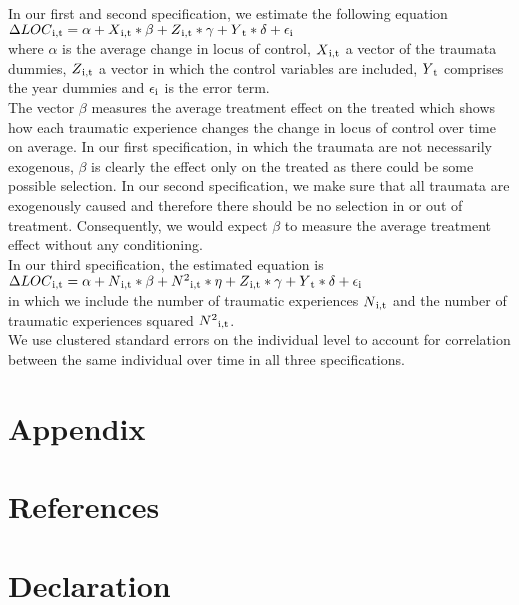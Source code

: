 \documentclass[12pt,a4paper,fleqn]{article}
\begin{document}
In our first and second specification, we estimate the following equation\\
$ \Delta LOC \textsubscript{i,t}= \alpha + X \textsubscript{i,t} * \beta + Z \textsubscript{i,t} * \gamma + Y\textsubscript{t} * \delta + \epsilon\textsubscript{i}  $ \\
where $\alpha$ is the average change in locus of control, $ X\textsubscript{i,t}$ a vector of the traumata dummies, $ Z\textsubscript{i,t}$ a vector in which the control variables are included, $ Y\textsubscript{t}$ comprises the year dummies and $\epsilon\textsubscript{i}$ is the error term. \\
The vector $\beta$ measures the average treatment effect on the treated which shows how each traumatic experience changes the change in locus of control over time on average. In our first specification, in which the traumata are not necessarily exogenous, $\beta $ is clearly the effect only on the treated as there could be some possible selection. In our second specification, we make sure that all traumata are exogenously caused and therefore there should be no selection in or out of treatment. Consequently, we would expect $\beta$ to measure the average treatment effect without any conditioning.  \\
In our third specification, the estimated equation is\\
$ \Delta LOC \textsubscript{i,t}= \alpha + N \textsubscript{i,t} * \beta + N \textsuperscript{2}\textsubscript{i,t} * \eta + Z \textsubscript{i,t} * \gamma + Y\textsubscript{t} * \delta + \epsilon\textsubscript{i}  $ \\
in which we include the number of traumatic experiences $N \textsubscript{i,t}$ and the number of traumatic experiences squared $N \textsuperscript{2}\textsubscript{i,t}$. \\
We use clustered standard errors on the individual level to account for correlation between the same individual over time in all three specifications. \\


\appendix
\setcounter{secnumdepth}{0}
\section{Appendix}




\pagebreak
\setcounter{secnumdepth}{0}
\section{References}


	
	
\pagebreak
\setcounter{secnumdepth}{0}
\section{Declaration}
\end{document}

